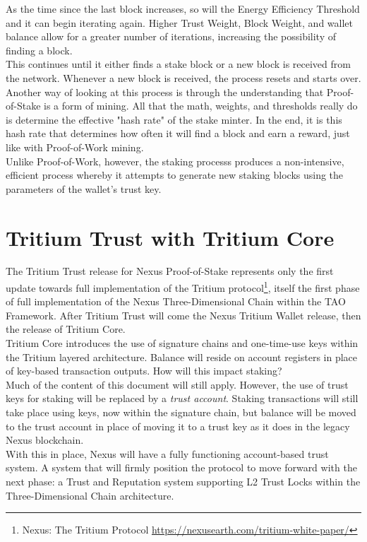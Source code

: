 \documentclass[11pt]{article}
\begin{document}
\noindent As the time since the last block increases, so will the Energy Efficiency Threshold and it can begin iterating again. Higher Trust Weight, Block Weight, and wallet balance allow for a greater number of iterations, increasing the possibility of finding a block.\\

\noindent This continues until it either finds a stake block or a new block is received from the network. Whenever a new block is received, the process resets and starts over.\\

\noindent Another way of looking at this process is through the understanding that Proof-of-Stake is a form of mining. All that the math, weights, and thresholds really do is determine the effective "hash rate" of the stake minter. In the end, it is this hash rate that determines how often it will find a block and earn a reward, just like with Proof-of-Work mining.\\

\noindent Unlike Proof-of-Work, however, the staking processs produces a non-intensive, efficient process whereby it attempts to generate new staking blocks using the parameters of the wallet’s trust key.\\

\bigskip

\section{Tritium Trust with Tritium Core}

The Tritium Trust release for Nexus Proof-of-Stake represents only the first update towards full implementation of the Tritium protocol\footnote{Nexus: The Tritium Protocol \url{https://nexusearth.com/tritium-white-paper/}}, itself the first phase of full implementation of the Nexus Three-Dimensional Chain within the TAO Framework. After Tritium Trust will come the Nexus Tritium Wallet release, then the release of Tritium Core.\\

\noindent Tritium Core introduces the use of signature chains and one-time-use keys within the Tritium layered architecture. Balance will reside on account registers in place of key-based transaction outputs. How will this impact staking?\\

\noindent Much of the content of this document will still apply. However, the use of trust keys for staking will be replaced by a \textit{trust account}. Staking transactions will still take place using keys, now within the signature chain, but balance will be moved to the trust account in place of moving it to a trust key as it does in the legacy Nexus blockchain.\\

\noindent With this in place, Nexus will have a fully functioning account-based trust system. A system that will firmly position the protocol to move forward with the next phase: a Trust and Reputation system supporting L2 Trust Locks within the Three-Dimensional Chain architecture.\\
\end{document}
